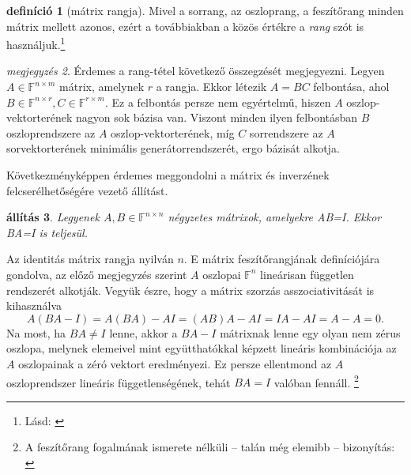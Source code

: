 \documentclass[9pt, a4paper, showtrims]{memoir}
\makeatletter
\renewenvironment{proof}[1][\proofname]
    {\par\pushQED{\qed}%
    \normalfont \topsep6\p@\@plus6\p@\relax
    \trivlist
    \item[\hskip\labelsep
        \itshape
    #1\@addpunct{:}]\ignorespaces}
    {\popQED\endtrivlist\@endpefalse}
\theoremstyle{plain}
\newtheorem{proposition}{állítás}[chapter]
\theoremstyle{remark}
\newtheorem{note}[proposition]{megjegyzés}
\theoremstyle{definition}
\newtheorem{definition}[proposition]{definíció}
\makeatother
\begin{document}
\begin{definition}[mátrix rangja]
    Mivel a sorrang, az oszloprang, a feszítőrang minden mátrix mellett azonos,
    ezért a továbbiakban a közös értékre a \emph{rang} szót is használjuk.\footnote{Lásd: \parencite{Wardlaw2005}}
\end{definition}
\begin{note}
    Érdemes a rang-tétel következő összegzését megjegyezni.
    Legyen $A\in\mathbb{F}^{n\times m}$ mátrix, amelynek $r$ a rangja.
    Ekkor létezik $A=BC$ felbontása, ahol $B\in\mathbb{F}^{n\times r},C\in\mathbb{F}^{r\times m}$.
    Ez a felbontás persze nem egyértelmű, hiszen $A$ oszlop-vektorterének nagyon sok bázisa van.
    Viszont minden ilyen felbontásban $B$ oszloprendszere az $A$ oszlop-vektorterének, 
    míg $C$ sorrendszere az $A$ sorvektorterének minimális generátorrendszerét, ergo bázisát alkotja.
\end{note}
Következményképpen érdemes meggondolni a mátrix és inverzének felcserélhetőségére vezető állítást.
\begin{proposition}
    Legyenek $A,B\in\mathbb{F}^{n\times n}$ négyzetes mátrixok, amelyekre AB=I.
    Ekkor BA=I is teljesül.
\end{proposition}
\begin{proof}
    Az identitás mátrix rangja nyilván $n$.
    E mátrix feszítőrangjának definíciójára gondolva, 
    az előző megjegyzés szerint $A$ oszlopai $\mathbb{F}^n$ lineárisan független rendszerét alkotják.
    Vegyük észre, hogy a mátrix szorzás asszociativitását is kihasználva
    \[
        A\left( BA-I \right)=A\left( BA \right)-AI=\left( AB \right)A-AI=IA-AI=A-A=0.
    \]
    Na most, 
    ha $BA\neq I$ lenne, 
    akkor a $BA-I$ mátrixnak lenne egy olyan nem zérus oszlopa, 
    melynek elemeivel mint együtthatókkal képzett lineáris kombinációja az $A$ oszlopainak 
    a zéró vektort eredményezi.
    Ez persze ellentmond az $A$ oszloprendszer lineáris függetlenségének,
    tehát $BA=I$ valóban fennáll.%
    \footnote{%
        A feszítőrang fogalmának ismerete nélküli -- talán még elemibb -- bizonyítás: \parencite{doi:10.4169/college.math.j.48.5.366}%
    }%
\end{proof}
\end{document}
